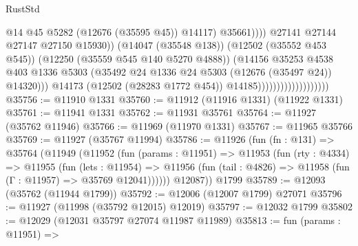 \begin{lexlean}{RustStd}
\begin{coremodule}
                                                          @14
                                                          @45
                                                          @5282
                                                          (@12676 (@35595 @45))
                                                          @14117)
                                                        @35661))))
                                                @27141
                                                @27144
                                                @27147
                                                @27150
                                                @15930))
                                            (@14047 (@35548 @138))
                                            (@12502 (@35552 @453 @545))
                                            (@12250 (@35559 @545 @140 @5270 @4888))
                                            (@14156
                                              @35253
                                              @4538
                                              @403
                                              @1336
                                              @5303
                                              (@35492
                                                @24
                                                @1336
                                                @24
                                                @5303
                                                (@12676 (@35497 @24))
                                                @14320)))
                                          @14173
                                          (@12502 (@28283 @1772 @454))
                                          @14185)))))))))))))))))))
@35756 := @11910 @1331
@35760 := @11912 (@11916 @1331) (@11922 @1331)
@35761 := @11941 @1331
@35762 := @11931 @35761
@35764 := @11927 (@35762 @11946)
@35766 := @11969 (@11970 @1331)
@35767 := @11965 @35766
@35769 := @11927 (@35767 @11994)
@35786 := @11926
    (fun (fn : @131) =>
    @35764
      (@11949
        (@11952
          (fun (params : @11951) =>
          @11953
            (fun (rty : @4334) =>
            @11955
              (fun (lets : @11954) =>
              @11956 (fun (tail : @4826) => @11958 (fun (Γ : @11957) => @35769 @12041))))))
        @12087))
    @1799
@35789 := @12093 (@35762 (@11944 @1799))
@35792 := @12006 (@12007 @1799) @27071
@35796 := @11927 (@11998 (@35792 @12015) @12019)
@35797 := @12032 @1799
@35802 := @12029 (@12031 @35797 @27074 @11987 @11989)
@35813 := fun (params : @11951) =>

\end{coremodule}
\end{lexlean}
